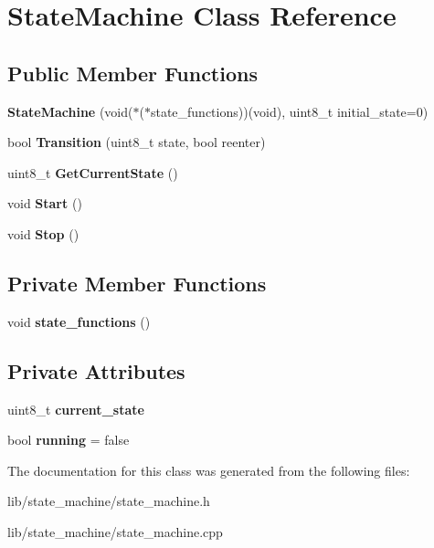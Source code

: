 \hypertarget{class_state_machine}{}\section{State\+Machine Class Reference}
\label{class_state_machine}
\subsection*{Public Member Functions}
\begin{DoxyCompactItemize}
\item 
\hypertarget{class_state_machine_ad9c6bdaca444710f77fc12d7e1af8fdc}{}\label{class_state_machine_ad9c6bdaca444710f77fc12d7e1af8fdc} 
{\bfseries State\+Machine} (void($\ast$($\ast$state\+\_\+functions))(void), uint8\+\_\+t initial\+\_\+state=0)
\item 
\hypertarget{class_state_machine_a1597799edc5a89006f164e52fd72d02b}{}\label{class_state_machine_a1597799edc5a89006f164e52fd72d02b} 
bool {\bfseries Transition} (uint8\+\_\+t state, bool reenter)
\item 
\hypertarget{class_state_machine_a62fd24666d16a2425c8397ce2d326dae}{}\label{class_state_machine_a62fd24666d16a2425c8397ce2d326dae} 
uint8\+\_\+t {\bfseries Get\+Current\+State} ()
\item 
\hypertarget{class_state_machine_a94c93f8203bab4f5a3784eba7445b582}{}\label{class_state_machine_a94c93f8203bab4f5a3784eba7445b582} 
void {\bfseries Start} ()
\item 
\hypertarget{class_state_machine_a2eb142249e4c483c8a329b1a18b4383f}{}\label{class_state_machine_a2eb142249e4c483c8a329b1a18b4383f} 
void {\bfseries Stop} ()
\end{DoxyCompactItemize}
\subsection*{Private Member Functions}
\begin{DoxyCompactItemize}
\item 
\hypertarget{class_state_machine_acc87359cd98c436f5b891ffe6cb67160}{}\label{class_state_machine_acc87359cd98c436f5b891ffe6cb67160} 
void {\bfseries state\+\_\+functions} ()
\end{DoxyCompactItemize}
\subsection*{Private Attributes}
\begin{DoxyCompactItemize}
\item 
\hypertarget{class_state_machine_abdcd9426d9a2ec9e2d703c74cd3299df}{}\label{class_state_machine_abdcd9426d9a2ec9e2d703c74cd3299df} 
uint8\+\_\+t {\bfseries current\+\_\+state}
\item 
\hypertarget{class_state_machine_adc6939485a12a6250df3cc65aa172d2a}{}\label{class_state_machine_adc6939485a12a6250df3cc65aa172d2a} 
bool {\bfseries running} = false
\end{DoxyCompactItemize}


The documentation for this class was generated from the following files\+:\begin{DoxyCompactItemize}
\item 
lib/state\+\_\+machine/state\+\_\+machine.\+h\item 
lib/state\+\_\+machine/state\+\_\+machine.\+cpp\end{DoxyCompactItemize}

